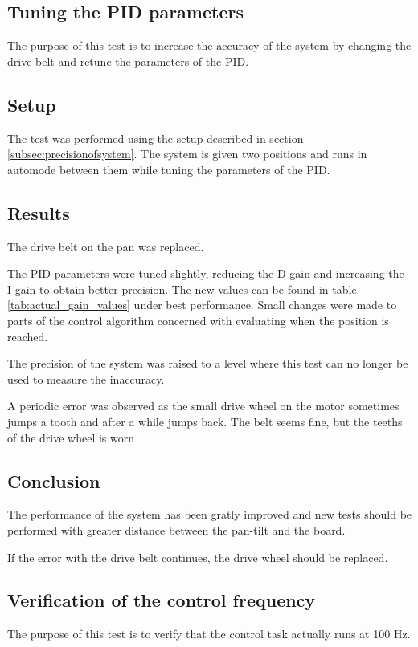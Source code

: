 \subsection{Tuning the PID parameters}
The purpose of this test is to increase the accuracy of the system by changing
the drive belt and retune the parameters of the PID.

\subsection*{Setup}
The test was performed using the setup described in section \ref{subsec:precisionofsystem}. The
system is given two positions and runs in automode between them while tuning the
parameters of the PID.

\subsection*{Results}
The drive belt on the pan was replaced.

The PID parameters were tuned slightly, reducing the D-gain and increasing the
I-gain to obtain better precision. The new values can be found in
table \ref{tab:actual_gain_values} under best performance. Small changes were made to
parts of the control algorithm concerned with evaluating when the position is reached.

The precision of the system was raised to a level where this test can no
longer be used to measure the inaccuracy. 

A periodic error was observed as the small drive wheel on the motor sometimes
jumps a tooth and after a while jumps back. The belt seems fine, but
the teeths of the drive wheel is worn

\subsection*{Conclusion}
The performance of the system has been gratly improved and new tests should be
performed with greater distance between the pan-tilt and the board. 

If the error with the drive belt continues, the drive wheel should be replaced.


\subsection{Verification of the control frequency}\label{subsec:control_freq}
The purpose of this test is to verify that the control task actually runs at 100 Hz.

